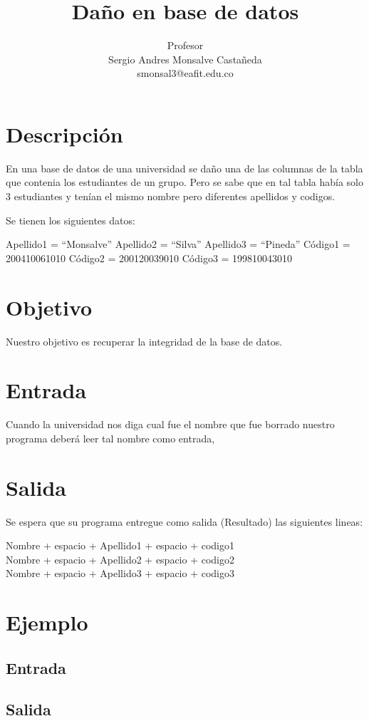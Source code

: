 \documentclass[11pt,letterpaper]{article}
\title{Daño en base de datos}
\author{
	Profesor\\
	Sergio Andres Monsalve Castañeda\\
	smonsal3@eafit.edu.co
}
\begin{document}
 
\pagestyle{fancyplain}
\fancyhf{}
\headheight=20pt %
\renewcommand{\headrulewidth}{0pt} %


\fancyfoot[c]{\thepage}

\maketitle

\begin{minipage}{3cm}
\end{minipage}


\section{Descripción}

En una base de datos de una universidad se daño una de las columnas de la tabla que contenia los estudiantes de un grupo. Pero se sabe que en tal tabla había solo 3 estudiantes y tenían el mismo nombre pero diferentes apellidos y codigos.

Se tienen los siguientes datos:

Apellido1 = ``Monsalve''
Apellido2 = ``Silva''
Apellido3 = ``Pineda''
Código1 = 200410061010
Código2 = 200120039010
Código3 = 199810043010


\section{Objetivo}

Nuestro objetivo es recuperar la integridad de la base de datos.

\section{Entrada}

Cuando la universidad nos diga cual fue el nombre que fue borrado nuestro programa deberá leer tal nombre como entrada, 

\section{Salida}

Se espera que su programa entregue como salida (Resultado) las siguientes lineas:

Nombre + espacio +  Apellido1 + espacio + codigo1 \\
Nombre + espacio +  Apellido2 + espacio + codigo2 \\
Nombre + espacio +  Apellido3 + espacio + codigo3 \\

\section{Ejemplo}
\subsection{Entrada}

\subsection{Salida}


%
%
\end{document}
